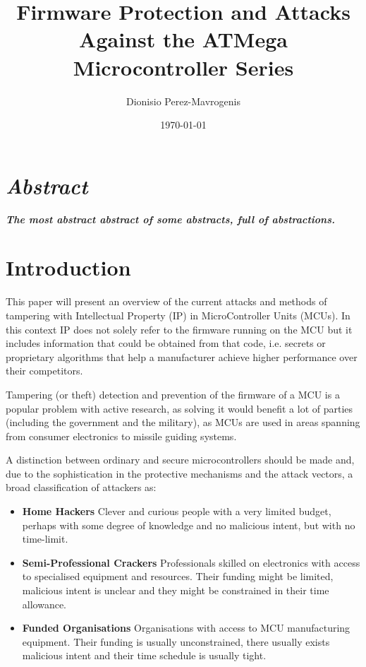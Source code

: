 \documentclass[10pt,a4paper,twocolumn]{article}
\author{Dionisio Perez-Mavrogenis}
\title{Firmware Protection and Attacks Against the ATMega Microcontroller Series}
\date{\today}
\begin{document}
	\maketitle
	
\section*{\emph{Abstract}}
	\textbf{\emph{The most abstract abstract of some abstracts, full of abstractions.}}
	

\section{Introduction}
	This paper will present an overview of the current attacks and methods of tampering with Intellectual Property (IP) in MicroController Units (MCUs). In this context IP does not solely refer to the firmware running on the MCU but it includes information that could be obtained from that code, i.e. secrets or proprietary algorithms that help a manufacturer achieve higher performance over their competitors.
	
	Tampering (or theft) detection and prevention of the firmware of a MCU is a popular problem with active research, as solving it would benefit a lot of parties (including the government and the military), as MCUs are used in areas spanning from consumer electronics to missile guiding systems.
	
	A distinction between ordinary and secure microcontrollers should be made\citep{website:scorobogatov_breaking_copy_protection} and, due to the sophistication in the protective mechanisms and the attack vectors, a broad classification of attackers as\cite{anderson:cautionary_note}:
		\begin{itemize}
			\item \textbf{Home Hackers} Clever and curious people with a very limited budget, perhaps with some degree of knowledge and no malicious intent, but with no time-limit.\\
			\item \textbf{Semi-Professional Crackers} Professionals skilled on electronics with access to specialised equipment and resources. Their funding might be limited, malicious intent is unclear and they might be constrained in their time allowance.\\
			\item \textbf{Funded Organisations} Organisations with access to MCU manufacturing equipment. Their funding is usually unconstrained, there usually exists malicious intent and their time schedule is usually tight.
		\end{itemize}
	
\end{document}
